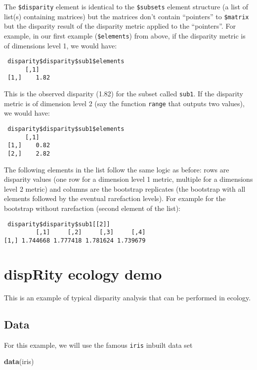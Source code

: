 \documentclass[
]{book}
\newenvironment{Shaded}{\begin{snugshade}}{\end{snugshade}}
\newcommand{\FunctionTok}[1]{\textcolor[rgb]{0.13,0.29,0.53}{\textbf{#1}}}
\newcommand{\NormalTok}[1]{#1}
\begin{document}
The \texttt{\$disparity} element is identical to the \texttt{\$subsets} element structure (a list of list(s) containing matrices) but the matrices don't contain ``pointers'' to \texttt{\$matrix} but the disparity result of the disparity metric applied to the ``pointers''.
For example, in our first example (\texttt{\$elements}) from above, if the disparity metric is of dimensions level 1, we would have:

\begin{verbatim}
 disparity$disparity$sub1$elements
      [,1]
 [1,]    1.82
\end{verbatim}

This is the observed disparity (1.82) for the subset called \texttt{sub1}.
If the disparity metric is of dimension level 2 (say the function \texttt{range} that outputs two values), we would have:

\begin{verbatim}
 disparity$disparity$sub1$elements
      [,1]
 [1,]    0.82
 [2,]    2.82
\end{verbatim}

The following elements in the list follow the same logic as before: rows are disparity values (one row for a dimension level 1 metric, multiple for a dimensions level 2 metric) and columns are the bootstrap replicates (the bootstrap with all elements followed by the eventual rarefaction levels).
For example for the bootstrap without rarefaction (second element of the list):

\begin{verbatim}
 disparity$disparity$sub1[[2]]
         [,1]     [,2]     [,3]     [,4]
[1,] 1.744668 1.777418 1.781624 1.739679 
\end{verbatim}

\hypertarget{disprity-ecology-demo}{%
\chapter{dispRity ecology demo}\label{disprity-ecology-demo}}

This is an example of typical disparity analysis that can be performed in ecology.

\hypertarget{data}{%
\section{Data}\label{data}}

For this example, we will use the famous \texttt{iris} inbuilt data set

\begin{Shaded}
\begin{Highlighting}[]
\FunctionTok{data}\NormalTok{(iris)}
\end{Highlighting}
\end{Shaded}
\end{document}
